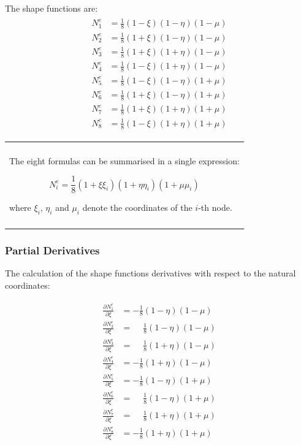 \documentclass[10pt,b5paper,titlepage]{book}
\newenvironment{bbox}[1][0.96]
{
    \begin{center}
        \begin{tabular}{|p{#1\textwidth}|}
            \hline\\
}
{
            \\\\\hline
        \end{tabular}
    \end{center}
}
\newenvironment{eqarray}
{
    \begin{eqnarray}
        \begin{aligned}
}
{
        \end{aligned}
    \end{eqnarray}
}
\begin{document}
The shape functions are:
\begin{eqarray}
    N_1^e &= \frac{1}{8} \left(1-\xi\right) \left(1-\eta\right) \left(1-\mu\right)\\
    N_2^e &= \frac{1}{8} \left(1+\xi\right) \left(1-\eta\right) \left(1-\mu\right)\\
    N_3^e &= \frac{1}{8} \left(1+\xi\right) \left(1+\eta\right) \left(1-\mu\right)\\
    N_4^e &= \frac{1}{8} \left(1-\xi\right) \left(1+\eta\right) \left(1-\mu\right)\\
    N_5^e &= \frac{1}{8} \left(1-\xi\right) \left(1-\eta\right) \left(1+\mu\right)\\
    N_6^e &= \frac{1}{8} \left(1+\xi\right) \left(1-\eta\right) \left(1+\mu\right)\\
    N_7^e &= \frac{1}{8} \left(1+\xi\right) \left(1+\eta\right) \left(1+\mu\right)\\
    N_8^e &= \frac{1}{8} \left(1-\xi\right) \left(1+\eta\right) \left(1+\mu\right)
\end{eqarray}

\begin{bbox}[0.96]
    The eight formulas can be summarised in a single expression:

    \begin{equation}
        N_i^e = \frac{1}{8}
              \left(1+\xi\xi_i\right)
              \left(1+\eta\eta_i\right)
              \left(1+\mu\mu_i\right)
    \end{equation}

    where $\xi_i$, $\eta_i$ and $\mu_i$ denote the coordinates of the $i$-th node.
\end{bbox}


\subsubsection{Partial Derivatives}
The calculation of the shape functions derivatives with respect to the natural
coordinates:

\begin{eqarray}
    \frac{\partial N_1^e}{\partial\xi} &= -\frac{1}{8} \left(1-\eta\right) \left(1-\mu\right)\\
    \frac{\partial N_2^e}{\partial\xi} &= \phantom{-}\frac{1}{8} \left(1-\eta\right) \left(1-\mu\right)\\
    \frac{\partial N_3^e}{\partial\xi} &= \phantom{-}\frac{1}{8} \left(1+\eta\right) \left(1-\mu\right)\\
    \frac{\partial N_4^e}{\partial\xi} &= -\frac{1}{8} \left(1+\eta\right) \left(1-\mu\right)\\
    \frac{\partial N_5^e}{\partial\xi} &= -\frac{1}{8} \left(1-\eta\right) \left(1+\mu\right)\\
    \frac{\partial N_6^e}{\partial\xi} &= \phantom{-}\frac{1}{8} \left(1-\eta\right) \left(1+\mu\right)\\
    \frac{\partial N_7^e}{\partial\xi} &= \phantom{-}\frac{1}{8} \left(1+\eta\right) \left(1+\mu\right)\\
    \frac{\partial N_8^e}{\partial\xi} &= -\frac{1}{8} \left(1+\eta\right) \left(1+\mu\right)
\end{eqarray}
\end{document}
